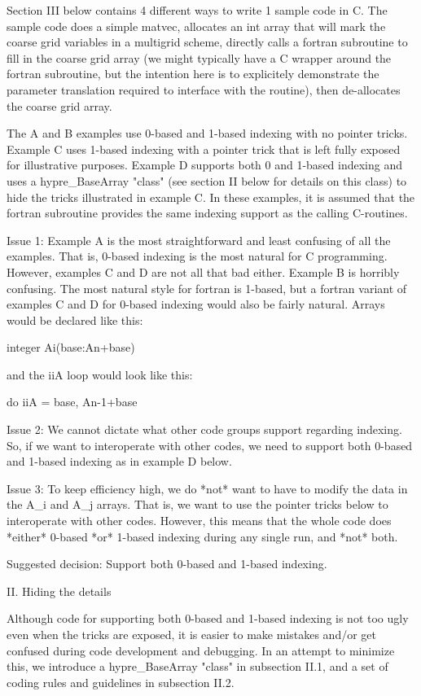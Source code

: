 Section III below contains 4 different ways to write 1 sample code in C.
The sample code does a simple matvec, allocates an int array that will
mark the coarse grid variables in a multigrid scheme, directly calls
a fortran subroutine to fill in the coarse grid array (we might
typically have a C wrapper around the fortran subroutine, but the
intention here is to explicitely demonstrate the parameter translation
required to interface with the routine), then de-allocates the coarse
grid array.

The A and B examples use 0-based and 1-based indexing with no pointer
tricks.  Example C uses 1-based indexing with a pointer trick that is
left fully exposed for illustrative purposes.  Example D supports both 0
and 1-based indexing and uses a hypre_BaseArray "class" (see section II
below for details on this class) to hide the tricks illustrated in
example C.  In these examples, it is assumed that the fortran subroutine
provides the same indexing support as the calling C-routines.

Issue 1:  Example A is the most straightforward and least confusing
of all the examples.  That is, 0-based indexing is the most natural for
C programming.  However, examples C and D are not all that bad either.
Example B is horribly confusing.  The most natural style for fortran is
1-based, but a fortran variant of examples C and D for 0-based indexing
would also be fairly natural.  Arrays would be declared like this:

     integer  Ai(base:An+base)

and the iiA loop would look like this:

     do iiA = base, An-1+base

Issue 2:  We cannot dictate what other code groups support regarding
indexing.  So, if we want to interoperate with other codes, we need to
support both 0-based and 1-based indexing as in example D below.

Issue 3:  To keep efficiency high, we do *not* want to have to modify
the data in the A_i and A_j arrays.  That is, we want to use the pointer
tricks below to interoperate with other codes.  However, this means that
the whole code does *either* 0-based *or* 1-based indexing during any single
run, and *not* both.

Suggested decision: Support both 0-based and 1-based indexing.


II. Hiding the details

Although code for supporting both 0-based and 1-based indexing is not
too ugly even when the tricks are exposed, it is easier to make mistakes
and/or get confused during code development and debugging.  In an attempt
to minimize this, we introduce a hypre_BaseArray "class" in subsection II.1,
and a set of coding rules and guidelines in subsection II.2.

